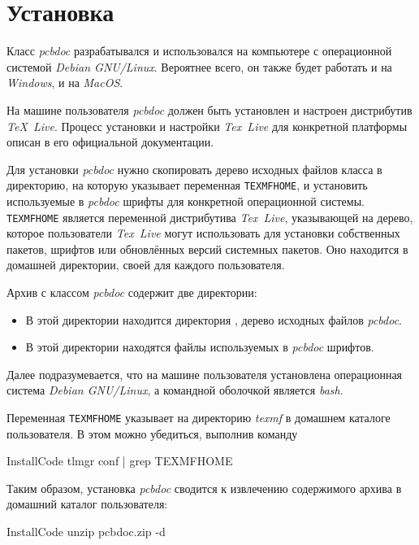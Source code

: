 
\section{Установка}

Класс \emph{pcbdoc} разрабатывался и использовался на компьютере с операционной
системой \emph{Debian GNU/Linux}. Вероятнее всего, он также будет работать и на
\emph{Windows}, и на \emph{MacOS}.

На машине пользователя \emph{pcbdoc} должен быть установлен и настроен
дистрибутив \emph{TeX~Live}. Процесс установки и настройки \emph{Tex~Live}
для конкретной платформы описан в его официальной документации.

Для установки \emph{pcbdoc} нужно скопировать дерево исходных файлов класса в
директорию, на которую указывает переменная \texttt{TEXMFHOME}, и установить
используемые в \emph{pcbdoc} шрифты для конкретной операционной системы.
\texttt{TEXMFHOME} является переменной дистрибутива \emph{Tex~Live},
указывающей на дерево, которое пользователи \emph{Tex~Live} могут использовать
для установки собственных пакетов, шрифтов или обновлённых версий системных
пакетов. Оно находится в домашней директории, своей для каждого пользователя.

Архив с классом \emph{pcbdoc} содержит две директории:
\begin{itemize}
  \item {}

  В этой директории находится директория , дерево исходных файлов
  \emph{pcbdoc}.

  \item {}

  В этой директории находятся файлы используемых в \emph{pcbdoc} шрифтов.

\end{itemize}

Далее подразумевается, что на машине пользователя установлена операционная
система \emph{Debian GNU/Linux}, а командной оболочкой является \emph{bash}.

Переменная \texttt{TEXMFHOME} указывает на директорию \emph{texmf} в домашнем
каталоге пользователя. В этом можно убедиться, выполнив команду

\begin{SaveVerbatim}{InstallCode}
  tlmgr conf | grep TEXMFHOME
\end{SaveVerbatim}
\colorbox{terminalcolor}{}

Таким образом, установка \emph{pcbdoc} сводится к извлечению содержимого архива
в домашний каталог пользователя:

\begin{SaveVerbatim}{InstallCode}
  unzip pcbdoc.zip -d ~
\end{SaveVerbatim}
\colorbox{terminalcolor}{}
